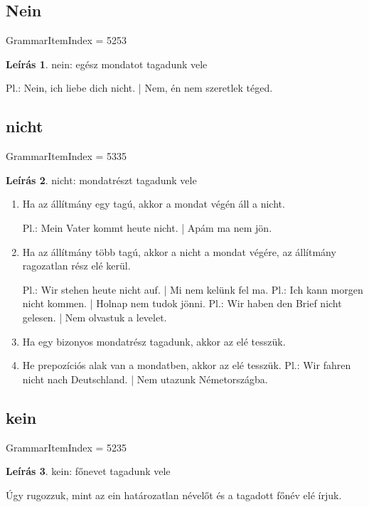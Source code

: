 \documentclass{article}
\theoremstyle{definition}
\newtheorem*{desc}{Leírás}
\begin{document}
\subsection{Nein}

GrammarItemIndex = 5253

\begin{desc}
nein: egész mondatot tagadunk vele

Pl.: Nein, ich liebe dich nicht. | Nem, én nem szeretlek téged.
\end{desc}

\subsection{nicht}

GrammarItemIndex = 5335

\begin{desc}
nicht: mondatrészt tagadunk vele

\begin{enumerate}
\item Ha az állítmány egy tagú, akkor a mondat végén áll a nicht.

Pl.: Mein Vater kommt heute nicht. | Apám ma nem jön.

\item Ha az állítmány több tagú, akkor a nicht a mondat végére, az állítmány ragozatlan rész elé kerül.

Pl.: Wir stehen heute nicht auf. | Mi nem kelünk fel ma.
Pl.: Ich kann morgen nicht kommen. | Holnap nem tudok jönni.
Pl.: Wir haben den Brief nicht gelesen. | Nem olvastuk a levelet.

\item Ha egy bizonyos mondatrész tagadunk, akkor az elé tesszük.
\item He prepozíciós alak van a mondatben, akkor az elé tesszük.
Pl.: Wir fahren nicht nach Deutschland. | Nem utazunk Németországba.
\end{enumerate}
\end{desc}

\subsection{kein}

GrammarItemIndex = 5235

\begin{desc}
kein: főnevet tagadunk vele

Úgy rugozzuk, mint az ein határozatlan névelőt és a tagadott főnév elé írjuk.
\end{desc}
\end{document}

